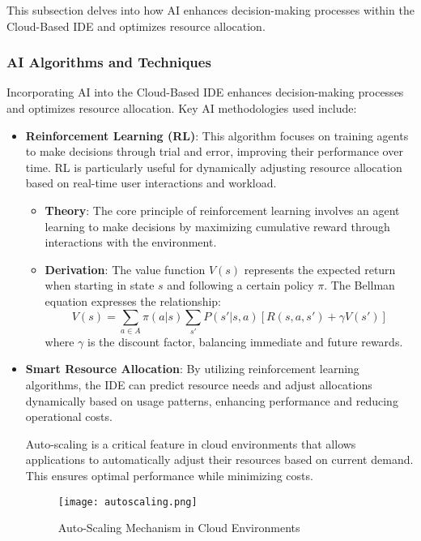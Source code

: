 \documentclass[12pt,a4paper,final]{report}
\begin{document}
This subsection delves into how AI enhances decision-making processes within the Cloud-Based IDE and optimizes resource allocation.

\subsubsection{AI Algorithms and Techniques}

Incorporating AI into the Cloud-Based IDE enhances decision-making processes and optimizes resource allocation. Key AI methodologies used include:

\begin{itemize}
    \item \textbf{Reinforcement Learning (RL)}: This algorithm focuses on training agents to make decisions through trial and error, improving their performance over time. RL is particularly useful for dynamically adjusting resource allocation based on real-time user interactions and workload.
    \begin{itemize}
        \item \textbf{Theory}: The core principle of reinforcement learning involves an agent learning to make decisions by maximizing cumulative reward through interactions with the environment.
        \item \textbf{Derivation}: The value function \( V(s) \) represents the expected return when starting in state \( s \) and following a certain policy \( \pi \). The Bellman equation expresses the relationship:
        \[
        V(s) = \sum_{a \in A} \pi(a|s) \sum_{s'} P(s'|s,a)[R(s,a,s') + \gamma V(s')]
        \]
        where \( \gamma \) is the discount factor, balancing immediate and future rewards.
    \end{itemize}

    \item \textbf{Smart Resource Allocation}: By utilizing reinforcement learning algorithms, the IDE can predict resource needs and adjust allocations dynamically based on usage patterns, enhancing performance and reducing operational costs.

    
\hspace{1cm}
Auto-scaling is a critical feature in cloud environments that allows applications to automatically adjust their resources based on current demand. This ensures optimal performance while minimizing costs.

\begin{figure}[h] %
    \centering
    \texttt{[image: autoscaling.png]} %
    \caption{Auto-Scaling Mechanism in Cloud Environments}
    \label{fig:autoscaling}
\end{figure}


\end{itemize}
\end{document}
